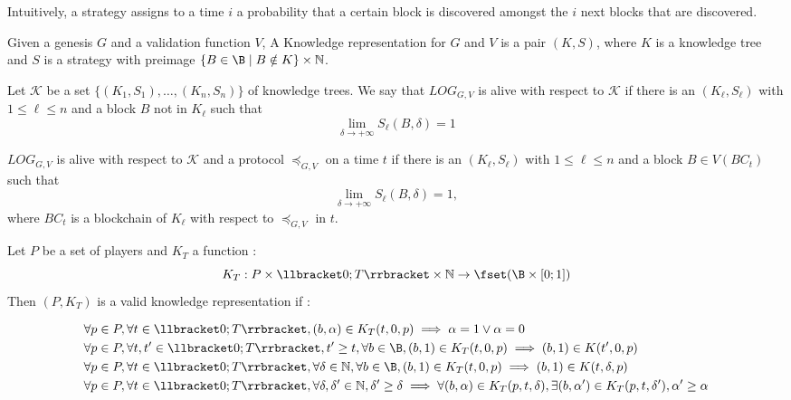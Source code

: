 Intuitively, a strategy assigns to a time $i$ a probability that a certain block is discovered amongst the 
$i$ next blocks that are discovered. 

\begin{mydef}
	Given a genesis $G$ and a validation function $V$, 
	A Knowledge representation for $G$ and $V$ is a pair $(K,S)$, where $K$ is a knowledge tree and 
	$S$ is a strategy with preimage $\{B \in \B \mid B \notin K\} \times \mathbb N$. 
\end{mydef}

Let $\mathcal K$ be a set $\{(K_1,S_1),\dots,(K_n,S_n)\}$ of knowledge trees. 
We say that $LOG_{G,V}$ is alive with respect to $\mathcal K$ if there is an $(K_\ell,S_\ell)$ with $1 \leq \ell \leq n$ 
and a block $B$ not in $K_\ell$ such that 
$$\lim\limits_{\delta\rightarrow +\infty}S_\ell(B,\delta) = 1$$

$LOG_{G,V}$ is alive with respect to $\mathcal K$ and a protocol $\preceq_{G,V}$ on a time $t$
if there is an $(K_\ell,S_\ell)$ with $1 \leq \ell \leq n$ 
and a block $B \in V(BC_t)$ such that 
$$\lim\limits_{\delta\rightarrow +\infty}S_\ell(B,\delta) = 1, $$
where $BC_t$ is a blockchain of $K_\ell$ with respect to $\preceq_{G,V}$ in $t$.

\begin{mydef}
Let $P$ be a set of players and $K_T$ a function :
$$K_{T} : P \times \llbracket 0;T \rrbracket \times \mathbb{N} \rightarrow \fset(\B \times [0;1])$$ 
Then $(P,K_{T})$ is a valid knowledge representation if :

\begin{eqnarray*}
&\forall p \in P,\forall t\in \llbracket 0;T \rrbracket, (b,\alpha) \in K_{T}(t,0,p) \implies \alpha = 1 \lor \alpha = 0\\
&\forall p \in P,\forall t,t'\in \llbracket 0;T \rrbracket, t' \geq t, \forall b \in \B,  (b,1) \in K_{T}(t,0,p) \implies (b,1) \in K(t',0,p)  \\
&\forall p \in P,\forall t\in \llbracket 0;T \rrbracket, \forall \delta \in \mathbb{N}, \forall b \in \B,  (b,1) \in K_{T}(t,0,p) \implies (b,1) \in K(t,\delta,p) \\
&\forall p \in P,\forall t\in \llbracket 0;T \rrbracket, \forall \delta,\delta' \in \mathbb{N}, \delta' \geq \delta \implies \forall (b,\alpha) \in K_{T}(p,t,\delta), \exists (b,\alpha') \in K_{T}(p,t,\delta'), \alpha'\geq \alpha\\
\end{eqnarray*}
\end{mydef}

